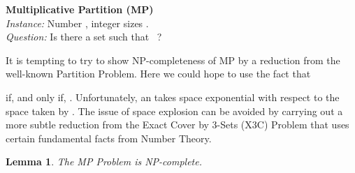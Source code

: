 \documentclass[letterpaper,11pt]{article}
\newtheorem{lemma}[theorem]{Lemma}
\newcommand{\FF}{\vspace*{\medskipamount}}
\begin{document}
\FF
\noindent
{\bf Multiplicative Partition (MP)}\\
{\it Instance:} Number , integer sizes .\\
{\it Question:} Is there a set  such that 
~?
\FF

It is tempting to try to show NP-completeness of MP by a reduction from the well-known Partition Problem. Here we could hope to use the fact that 

if, and only if, 
. Unfortunately, an  takes space exponential with respect to the space taken by . The issue of space explosion can be avoided by carrying out a more subtle reduction from the Exact Cover by 3-Sets (X3C) Problem that uses certain 
fundamental
facts from Number Theory.


\begin{lemma}
The MP Problem is NP-complete.
\end{lemma}
\end{document}
